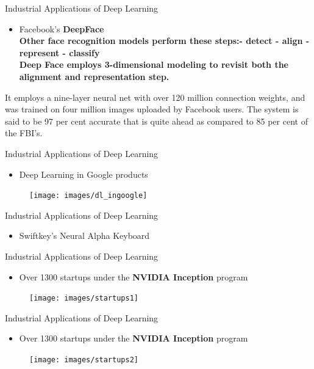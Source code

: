 \documentclass[10pt]{beamer}
\begin{document}
	\begin{frame}[t]{Industrial Applications of Deep Learning}
		\begin{itemize}
			\item \large{Facebook's \textbf{DeepFace}}
			\\
			\bigskip
			\textbf{Other face recognition models perform these steps:- detect - align - represent - classify
			\\
			\bigskip	
			Deep Face employs 3-dimensional modeling to revisit both the alignment and representation step.
			}
		\end{itemize}
		\bigskip
		It employs a nine-layer neural net with over 120 million connection weights, and was trained on four million images uploaded by Facebook users. The system is said to be 97 per cent accurate that is quite ahead as compared to 85 per cent of the FBI's. 
	\end{frame}
	\begin{frame}[t]{Industrial Applications of Deep Learning}
		\begin{itemize}
			\item \large{Deep Learning in Google products}
		\end{itemize}
		\begin{figure}
			\texttt{[image: images/dl\_ingoogle]}
		\end{figure}
	\end{frame}
	\begin{frame}[t]{Industrial Applications of Deep Learning}
		\begin{itemize}
			\item \large{Swiftkey's Neural Alpha Keyboard}
		\end{itemize}
	\end{frame}	
	\begin{frame}[t]{Industrial Applications of Deep Learning}
		\begin{itemize}
			\item \large{Over 1300 startups under the \textbf{NVIDIA Inception} program}
		\end{itemize}
		\begin{figure}
			\texttt{[image: images/startups1]}
		\end{figure}
	\end{frame}	
	\begin{frame}[t]{Industrial Applications of Deep Learning}
		\begin{itemize}
			\item \large{Over 1300 startups under the \textbf{NVIDIA Inception} program}
		\end{itemize}
		\begin{figure}
			\texttt{[image: images/startups2]}
		\end{figure}
	\end{frame}	
\end{document}
